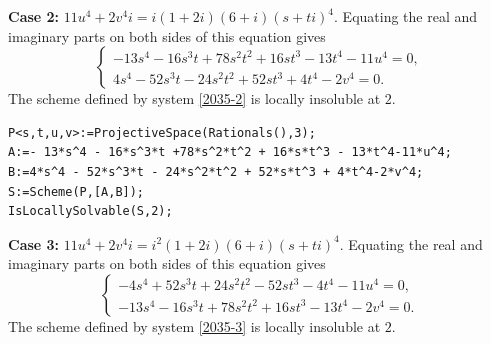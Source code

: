 \documentclass[a4paper,12pt,english,reqno]{amsart}
\begin{document}
{\bf Case 2:} $11u^4+2v^4i=i(1+2i)(6+i)(s+ti)^4$. Equating the real and imaginary parts on both sides of this equation gives
\begin{equation}\label{2035-2}
\begin{cases}
-13s^4 - 16s^3t + 78s^2t^2 + 16st^3 - 13t^4 - 11u^4=0,\\
4s^4 - 52s^3t - 24s^2t^2 + 52st^3 + 4t^4 - 2v^4=0.
\end{cases}
\end{equation}
The scheme defined by system \eqref{2035-2} is locally insoluble at $2$.


\begin{lstlisting}
P<s,t,u,v>:=ProjectiveSpace(Rationals(),3);
A:=- 13*s^4 - 16*s^3*t +78*s^2*t^2 + 16*s*t^3 - 13*t^4-11*u^4;
B:=4*s^4 - 52*s^3*t - 24*s^2*t^2 + 52*s*t^3 + 4*t^4-2*v^4;
S:=Scheme(P,[A,B]);
IsLocallySolvable(S,2);
\end{lstlisting}

{\bf Case 3:} $11u^4+2v^4i=i^2(1+2i)(6+i)(s+ti)^4$. Equating the real and imaginary parts on both sides of this equation gives
\begin{equation}\label{2035-3}
\begin{cases}
-4s^4 + 52s^3t + 24s^2t^2 - 52st^3 - 4t^4 - 11u^4=0,\\
-13s^4 - 16s^3t + 78s^2t^2 + 16st^3 - 13t^4 - 2v^4=0.
\end{cases}
\end{equation}
The scheme defined by system \eqref{2035-3} is locally insoluble at $2$.

\end{document}
